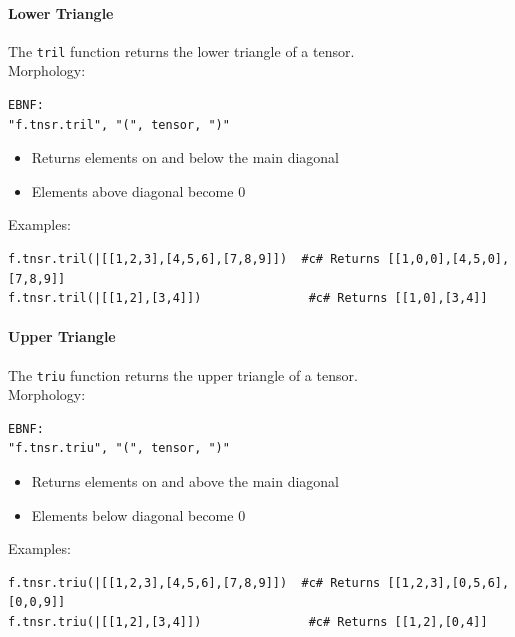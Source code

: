 \paragraph{Lower Triangle}
The \texttt{tril} function returns the lower triangle of a tensor.\\
Morphology:
\begin{verbatim}
EBNF:
"f.tnsr.tril", "(", tensor, ")"
\end{verbatim}
\begin{itemize}
\item Returns elements on and below the main diagonal
\item Elements above diagonal become 0
\end{itemize}
Examples:
\begin{verbatim}
f.tnsr.tril(|[[1,2,3],[4,5,6],[7,8,9]])  #c# Returns [[1,0,0],[4,5,0],[7,8,9]]
f.tnsr.tril(|[[1,2],[3,4]])               #c# Returns [[1,0],[3,4]]
\end{verbatim}

\paragraph{Upper Triangle}
The \texttt{triu} function returns the upper triangle of a tensor.\\
Morphology:
\begin{verbatim}
EBNF:
"f.tnsr.triu", "(", tensor, ")"
\end{verbatim}
\begin{itemize}
\item Returns elements on and above the main diagonal
\item Elements below diagonal become 0
\end{itemize}
Examples:
\begin{verbatim}
f.tnsr.triu(|[[1,2,3],[4,5,6],[7,8,9]])  #c# Returns [[1,2,3],[0,5,6],[0,0,9]]
f.tnsr.triu(|[[1,2],[3,4]])               #c# Returns [[1,2],[0,4]]
\end{verbatim}

